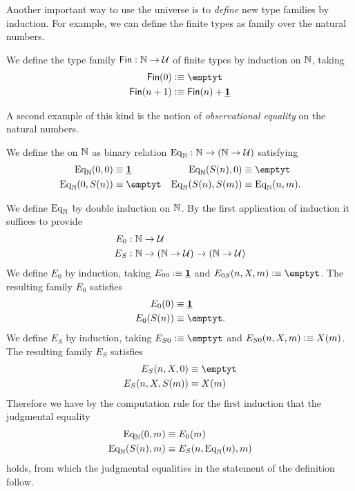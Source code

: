 Another important way to use the universe is to \emph{define} new type families by induction. For example, we can define the finite types as family over the natural numbers.

\begin{defn}\label{defn:fin}
We define the type family $\mathsf{Fin}:\mathbb{N}\to\mathcal{U}$ of finite types by induction on $\mathbb{N}$, taking
\begin{align*}
\mathsf{Fin}(0) & \defeq \emptyt \\
\mathsf{Fin}(n+1) & \defeq \mathsf{Fin}(n)+\unit
\end{align*}
\end{defn}

A second example of this kind is the notion of \emph{observational equality} on the natural numbers.

\begin{defn}\label{defn:obs_nat}
We define the  on $\mathbb{N}$ as binary relation $\mathrm{Eq}_\mathbb{N}:\mathbb{N}\to(\mathbb{N}\to\mathcal{U})$ satisfying
\begin{align*}
\mathrm{Eq}_\N(0,0) & \jdeq \unit & \mathrm{Eq}_\N(S(n),0) & \jdeq \emptyt \\
\mathrm{Eq}_\N(0,S(n)) & \jdeq \emptyt & \mathrm{Eq}_\N(S(n),S(m)) & \jdeq \mathrm{Eq}_\N(n,m).
\end{align*}
\end{defn}

\begin{constr}
We define $\mathrm{Eq}_\mathbb{N}$ by double induction on $\mathbb{N}$. By the first application of induction it suffices to provide
\begin{align*}
E_0 & : \mathbb{N}\to\mathcal{U} \\
E_S & : \mathbb{N}\to (\mathbb{N}\to\mathcal{U})\to(\mathbb{N}\to\mathcal{U})
\end{align*}
We define $E_0$ by induction, taking $E_{00}\vcentcolon\equiv \underline{\mathbf{1}}$ and $E_{0S}(n,X,m)\defeq \emptyt$. The resulting family $E_0$ satisfies
\begin{align*}
E_0(0) & \jdeq \unit \\
E_0(S(n)) & \jdeq \emptyt.
\end{align*} 
We define $E_S$ by induction, taking $E_{S0}\defeq \emptyt$ and $E_{S0}(n,X,m)\vcentcolon\equiv X(m)$. The resulting family $E_S$ satisfies
\begin{align*}
E_S(n,X,0) & \jdeq \emptyt \\
E_S(n,X,S(m)) & \jdeq X(m) 
\end{align*}
Therefore we have by the computation rule for the first induction that the judgmental equality
\begin{align*}
\mathrm{Eq}_\mathbb{N}(0,m) & \equiv E_0(m) \\
\mathrm{Eq}_\mathbb{N}(S(n),m) & \equiv E_S(n,\mathrm{Eq}_\mathbb{N}(n),m)
\end{align*}
holds, from which the judgmental equalities in the statement of the definition follow.
\end{constr}

